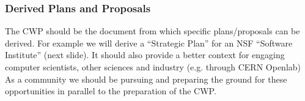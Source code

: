 \begin{frame}
\frametitle{Derived Plans and Proposals} 
The CWP should be the document from which specific plans/proposals can be derived. For example we will derive a ``Strategic Plan'' for an NSF ``Software 
Institute'' (next slide).
\vskip 0.15in
It should also provide a better context for engaging computer scientists, other sciences and industry (e.g. through CERN Openlab)
\vskip 0.15in
As a community we should be pursuing and preparing the ground for these opportunities in parallel to the preparation of the CWP.
\end{frame}


